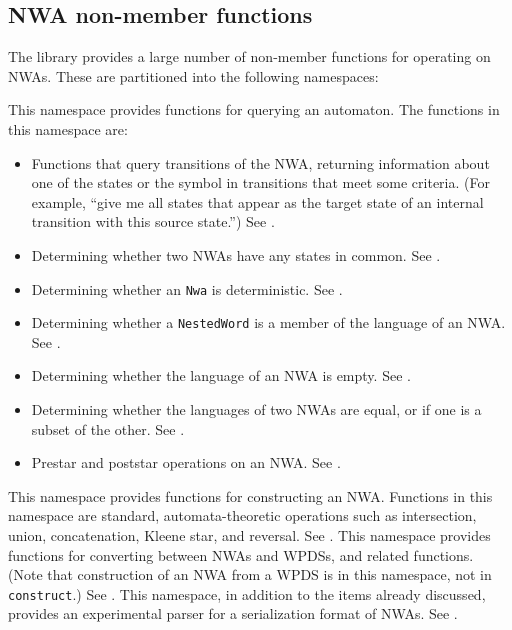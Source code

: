 \subsection{NWA non-member functions}

The library provides a large number of non-member functions for operating on
NWAs. These are partitioned into the following namespaces:

\begin{functionlist}
   This namespace provides functions for
    querying an automaton. The functions in this namespace are:
    \begin{itemize}
      \item Functions that query transitions of
        the NWA, returning information about one of the states or the symbol
        in transitions that meet some criteria. (For example, ``give me all
        states that appear as the target state of an internal transition with
        this source state.'') See .
      \item Determining whether two NWAs have any states in
        common. See .
      \item Determining whether an \texttt{Nwa} is deterministic. See
        .
      \item Determining whether a \texttt{NestedWord} is a member of the
        language of an NWA. See .
      \item Determining whether the language of an NWA is empty. See
        .
      \item Determining whether the languages of two NWAs are equal, or if
        one is a subset of the other. See .
      \item Prestar and poststar operations on an NWA. See
        .
    \end{itemize}
    
   This namespace provides functions for
    constructing an NWA. Functions in this namespace are standard,
    automata-theoretic operations such as intersection, union, concatenation,
    Kleene star, and reversal. See .
   This namespace provides functions for
    converting between NWAs and WPDSs, and related functions. (Note that
    construction of an NWA from a WPDS is in this namespace, not in
    \texttt{construct}.) See .
   This namespace, in addition to the items already
    discussed, provides an experimental parser for a serialization format of
    NWAs. See .
\end{functionlist}


